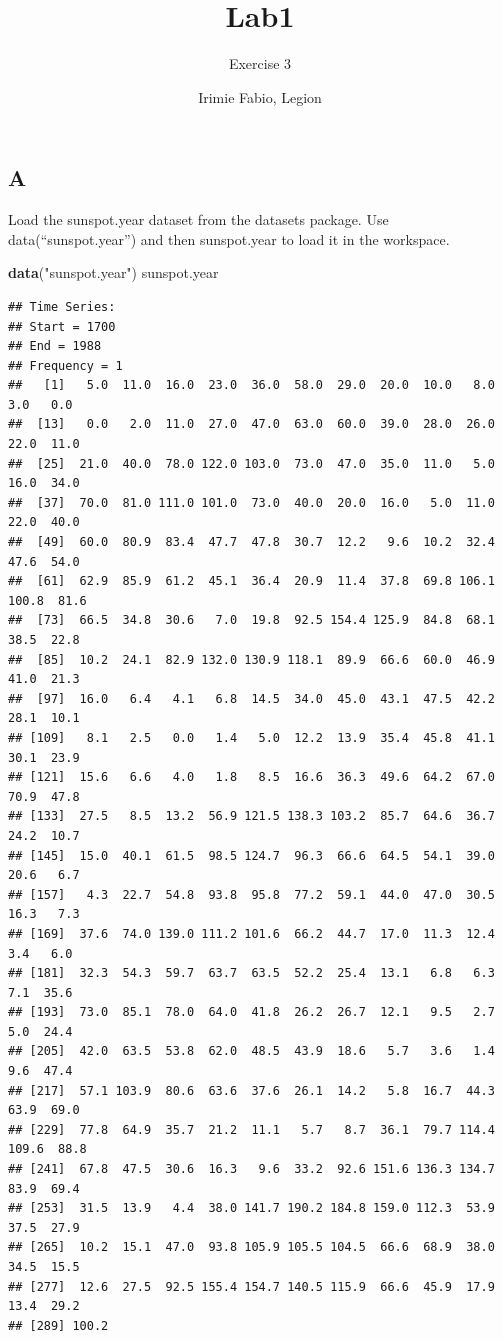 \documentclass[
]{article}
\title{Lab1}
\subtitle{Exercise 3}
\author{Irimie Fabio, Legion}
\date{}
\newenvironment{Shaded}{\begin{snugshade}}{\end{snugshade}}
\newcommand{\FunctionTok}[1]{\textcolor[rgb]{0.13,0.29,0.53}{\textbf{#1}}}
\newcommand{\NormalTok}[1]{#1}
\newcommand{\StringTok}[1]{\textcolor[rgb]{0.31,0.60,0.02}{#1}}
\begin{document}
\maketitle

{
\setcounter{tocdepth}{2}
\tableofcontents
}
\hypertarget{a}{%
\subsection{A}\label{a}}

Load the sunspot.year dataset from the datasets package. Use
data(``sunspot.year'') and then sunspot.year to load it in the
workspace.

\begin{Shaded}
\begin{Highlighting}[]
\FunctionTok{data}\NormalTok{(}\StringTok{"sunspot.year"}\NormalTok{)}
\NormalTok{sunspot.year}
\end{Highlighting}
\end{Shaded}

\begin{verbatim}
## Time Series:
## Start = 1700 
## End = 1988 
## Frequency = 1 
##   [1]   5.0  11.0  16.0  23.0  36.0  58.0  29.0  20.0  10.0   8.0   3.0   0.0
##  [13]   0.0   2.0  11.0  27.0  47.0  63.0  60.0  39.0  28.0  26.0  22.0  11.0
##  [25]  21.0  40.0  78.0 122.0 103.0  73.0  47.0  35.0  11.0   5.0  16.0  34.0
##  [37]  70.0  81.0 111.0 101.0  73.0  40.0  20.0  16.0   5.0  11.0  22.0  40.0
##  [49]  60.0  80.9  83.4  47.7  47.8  30.7  12.2   9.6  10.2  32.4  47.6  54.0
##  [61]  62.9  85.9  61.2  45.1  36.4  20.9  11.4  37.8  69.8 106.1 100.8  81.6
##  [73]  66.5  34.8  30.6   7.0  19.8  92.5 154.4 125.9  84.8  68.1  38.5  22.8
##  [85]  10.2  24.1  82.9 132.0 130.9 118.1  89.9  66.6  60.0  46.9  41.0  21.3
##  [97]  16.0   6.4   4.1   6.8  14.5  34.0  45.0  43.1  47.5  42.2  28.1  10.1
## [109]   8.1   2.5   0.0   1.4   5.0  12.2  13.9  35.4  45.8  41.1  30.1  23.9
## [121]  15.6   6.6   4.0   1.8   8.5  16.6  36.3  49.6  64.2  67.0  70.9  47.8
## [133]  27.5   8.5  13.2  56.9 121.5 138.3 103.2  85.7  64.6  36.7  24.2  10.7
## [145]  15.0  40.1  61.5  98.5 124.7  96.3  66.6  64.5  54.1  39.0  20.6   6.7
## [157]   4.3  22.7  54.8  93.8  95.8  77.2  59.1  44.0  47.0  30.5  16.3   7.3
## [169]  37.6  74.0 139.0 111.2 101.6  66.2  44.7  17.0  11.3  12.4   3.4   6.0
## [181]  32.3  54.3  59.7  63.7  63.5  52.2  25.4  13.1   6.8   6.3   7.1  35.6
## [193]  73.0  85.1  78.0  64.0  41.8  26.2  26.7  12.1   9.5   2.7   5.0  24.4
## [205]  42.0  63.5  53.8  62.0  48.5  43.9  18.6   5.7   3.6   1.4   9.6  47.4
## [217]  57.1 103.9  80.6  63.6  37.6  26.1  14.2   5.8  16.7  44.3  63.9  69.0
## [229]  77.8  64.9  35.7  21.2  11.1   5.7   8.7  36.1  79.7 114.4 109.6  88.8
## [241]  67.8  47.5  30.6  16.3   9.6  33.2  92.6 151.6 136.3 134.7  83.9  69.4
## [253]  31.5  13.9   4.4  38.0 141.7 190.2 184.8 159.0 112.3  53.9  37.5  27.9
## [265]  10.2  15.1  47.0  93.8 105.9 105.5 104.5  66.6  68.9  38.0  34.5  15.5
## [277]  12.6  27.5  92.5 155.4 154.7 140.5 115.9  66.6  45.9  17.9  13.4  29.2
## [289] 100.2
\end{verbatim}
\end{document}
